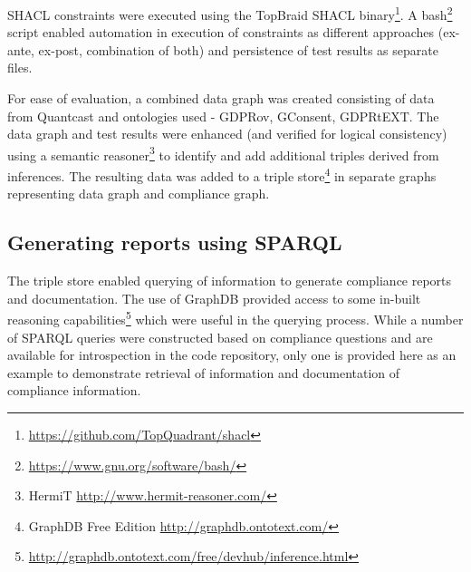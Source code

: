 SHACL constraints were executed using the TopBraid SHACL binary\footnote{\url{https://github.com/TopQuadrant/shacl}}.
A bash\footnote{\url{https://www.gnu.org/software/bash/}} script enabled automation in execution of constraints as different approaches (ex-ante, ex-post, combination of both) and persistence of test results as separate files.

For ease of evaluation, a combined data graph was created consisting of data from Quantcast and ontologies used - GDPRov, GConsent, GDPRtEXT. 
The data graph and test results were enhanced (and verified for logical consistency) using a semantic reasoner\footnote{HermiT \url{http://www.hermit-reasoner.com/}} to identify and add additional triples derived from inferences.
The resulting data was added to a triple store\footnote{GraphDB Free Edition \url{http://graphdb.ontotext.com/}} in separate graphs representing data graph and compliance graph.

\subsection{Generating reports using SPARQL}\label{sec:testing:shacl:reports}
The triple store enabled querying of information to generate compliance reports and documentation.
The use of GraphDB provided access to some in-built reasoning capabilities\footnote{\url{http://graphdb.ontotext.com/free/devhub/inference.html}} which were useful in the querying process.
While a number of SPARQL queries were constructed based on compliance questions and are available for introspection in the code repository, only one is provided here as an example to demonstrate retrieval of information and documentation of compliance information.

